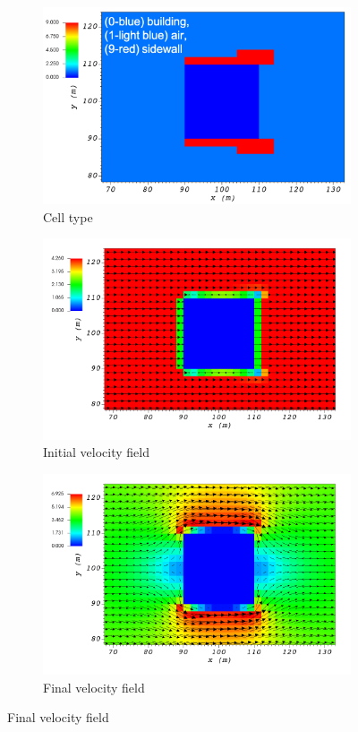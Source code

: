 \documentclass[14pt,landscape]{report}
\begin{document}
\begin{figure}[p]
    \centering
    \begin{subfigure}[t]{0.45\textwidth}
    \centering
    \includegraphics[width=10.3cm,keepaspectratio]{Images/sidewall_z_5_1_init_icell.png}
    \caption{Cell type}
    \end{subfigure}
    \begin{subfigure}[t]{0.45\textwidth}
    \centering
    \includegraphics[width=11.0cm,keepaspectratio]{Images/sidewall_z_5_1_init_vel.png}
    \caption{Initial velocity field}
    \end{subfigure}
    \begin{subfigure}[t]{0.45\textwidth}
    \centering
    \includegraphics[width=11.0cm,keepaspectratio]{Images/sidewall_z_5_1_final.png}
    \caption{Final velocity field}
    \end{subfigure}
\end{figure}
\end{document}
